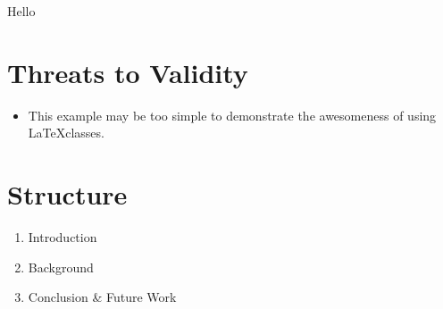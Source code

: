 \documentclass{paper_proposal}
\begin{document}

Hello

\section{Threats to Validity}
\begin{itemize}
  \item This example may be too simple to demonstrate the awesomeness of using
    \LaTeX classes.
\end{itemize}

\section{Structure}

\begin{enumerate}
  \item Introduction
  \item Background
  \item Conclusion \& Future Work
\end{enumerate}
\end{document}
